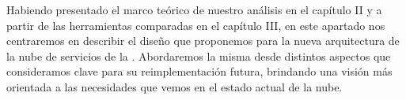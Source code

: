 Habiendo presentado el marco teórico de nuestro análisis en el capítulo II y a partir de las herramientas comparadas en el capítulo III, en este apartado nos centraremos en describir el diseño que proponemos para la nueva arquitectura de la nube de servicios de la {\unlp}. Abordaremos la misma desde distintos aspectos que consideramos clave para su reimplementación futura, brindando una visión más orientada a las necesidades que vemos en el estado actual de la nube.
